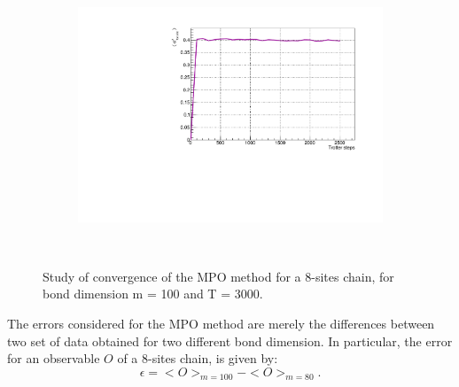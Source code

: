 \begin{figure}[H]
\begin{subfigure}{\columnwidth}
    \label{fig:12sites_LMvsGamma}
\end{subfigure}\\
\begin{subfigure}{\columnwidth}
\centering
    \includegraphics[scale=0.6]{Figures/convergence/ConvergenceLM_L016_m080_Time002500_J1051.pdf}
    \label{fig:16sites_LMvsGamma}
\end{subfigure}\\
\captionsetup{width=1.\linewidth}
\caption{Study of convergence of the MPO method for a 8-sites chain, for bond dimension m = 100 and T = 3000.}
\label{fig:convergence_8_12_16}
\end{figure}

The errors considered for the MPO method are merely the differences between two set of data obtained for two different bond dimension. In particular, the error for an observable $O$ of a 8-sites chain, is given by:
\begin{equation*}
    \epsilon = <O>_{m=100} - <O>_{m=80}.
\end{equation*}